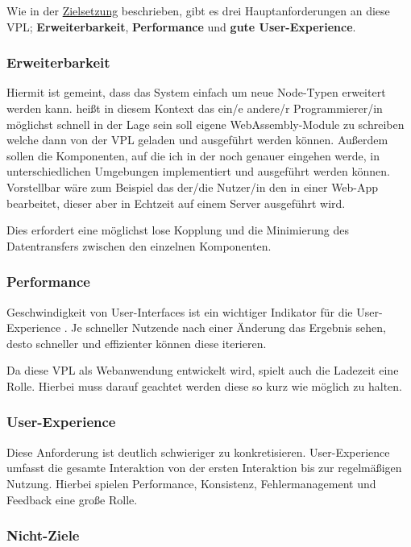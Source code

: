 \documentclass[ngerman]{article}
\begin{document}
Wie in der \hyperref[sec:Zielsetzung]{Zielsetzung} beschrieben, gibt es drei Hauptanforderungen an diese VPL; \textbf{Erweiterbarkeit}, \textbf{Performance} und \textbf{gute User-Experience}.

\subsubsection{Erweiterbarkeit}

Hiermit ist gemeint, dass das System einfach um neue Node-Typen erweitert werden kann.
 heißt in diesem Kontext das ein/e andere/r Programmierer/in möglichst 
schnell in der Lage sein soll eigene WebAssembly-Module zu schreiben welche dann von der VPL geladen und ausgeführt werden können.
\br
Außerdem sollen die Komponenten, auf die ich in der  noch genauer eingehen werde, in unterschiedlichen Umgebungen implementiert und ausgeführt werden können.
Vorstellbar wäre zum Beispiel das der/die Nutzer/in den  in einer Web-App bearbeitet, dieser aber in Echtzeit auf einem Server ausgeführt wird.

Dies erfordert eine möglichst lose Kopplung und die Minimierung des Datentransfers zwischen den einzelnen Komponenten.

\subsubsection{Performance}

Geschwindigkeit von User-Interfaces ist ein wichtiger Indikator für die User-Experience \cite{6876022}. 
Je schneller Nutzende nach einer Änderung das Ergebnis sehen, desto schneller und effizienter können diese iterieren. 

Da diese VPL als Webanwendung entwickelt wird, spielt auch die Ladezeit eine Rolle. 
Hierbei muss darauf geachtet werden diese so kurz wie möglich zu halten.

\subsubsection{User-Experience}

Diese Anforderung ist deutlich schwieriger zu konkretisieren. User-Experience umfasst die gesamte Interaktion von der ersten Interaktion bis zur regelmäßigen Nutzung.
Hierbei spielen Performance, Konsistenz, Fehlermanagement und Feedback eine große Rolle.

\subsubsection{Nicht-Ziele}
\end{document}

